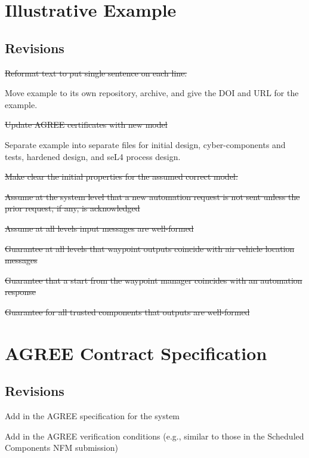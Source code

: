 \documentclass[global,twocolumn]{svjour}
\begin{document}
\section{Illustrative Example} \label{sec:example}


\subsection{Revisions}
\begin{compactitem}
  \item \sout{Reformat text to put single sentence on each line.}
  \item Move example to its own repository, archive, and give the DOI and URL for the example.
  \item \sout{Update AGREE certificates with new model}
  \item Separate example into separate files for initial design, cyber-components and tests, hardened design, and seL4 process design.
  \item \sout{Make clear the initial properties for the assumed correct model:}
    \begin{compactitem}
      \item \sout{Assume at the system level that a new automation request is not sent unless the prior request, if any, is acknowledged}
      \item \sout{Assume at all levels input messages are well-formed}
      \item \sout{Guarantee at all levels that waypoint outputs coincide with air vehicle location messages}
      \item \sout{Guarantee that a start from the waypoint manager coincides with an automation response}
      \item \sout{Guarantee for all trusted components that outputs are well-formed}
    \end{compactitem}
\end{compactitem}

\section{AGREE Contract Specification} \label{sec:agree}


\subsection{Revisions}
\begin{compactitem}
  \item Add in the AGREE specification for the system
  \item Add in the AGREE verification conditions (e.g., similar to those in the Scheduled Components NFM submission)
\end{compactitem}
\end{document}
